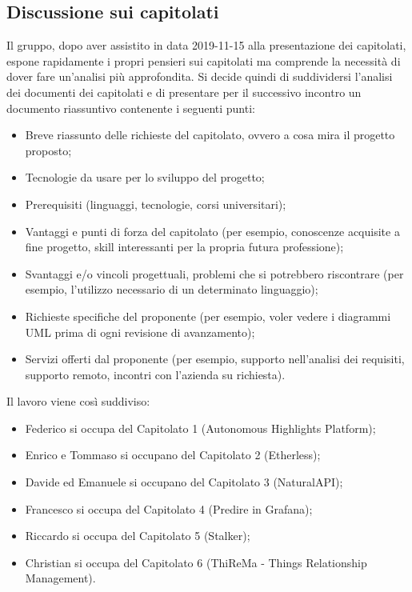 \subsection{Discussione sui capitolati}
Il gruppo, dopo aver assistito in data 2019-11-15 alla presentazione dei capitolati, espone rapidamente i propri pensieri sui capitolati ma comprende la necessità di dover fare un'analisi più approfondita.
Si decide quindi di suddividersi l'analisi dei documenti dei capitolati e di presentare per il successivo incontro un documento riassuntivo contenente i seguenti punti:
\begin{itemize}
	\item Breve riassunto delle richieste del capitolato, ovvero a cosa mira il progetto proposto;
	\item Tecnologie da usare per lo sviluppo del progetto;
	\item Prerequisiti (linguaggi, tecnologie, corsi universitari);
	\item Vantaggi e punti di forza del capitolato (per esempio, conoscenze acquisite a fine progetto, skill interessanti per la propria futura professione);
	\item Svantaggi e/o vincoli progettuali, problemi che si potrebbero riscontrare (per esempio, l'utilizzo necessario di un determinato linguaggio);
	\item Richieste specifiche del proponente (per esempio, voler vedere i diagrammi UML prima di ogni revisione di avanzamento);
	\item Servizi offerti dal proponente (per esempio, supporto nell'analisi dei requisiti, supporto remoto, incontri con l'azienda su richiesta).
\end{itemize}
Il lavoro viene così suddiviso:
\begin{itemize}
	\item Federico si occupa del Capitolato 1 (Autonomous Highlights Platform);
	\item Enrico e Tommaso si occupano del Capitolato 2 (Etherless);
	\item Davide ed Emanuele si occupano del Capitolato 3 (NaturalAPI);
	\item Francesco si occupa del Capitolato 4 (Predire in Grafana);
	\item Riccardo si occupa del Capitolato 5 (Stalker);
	\item Christian si occupa del Capitolato 6 (ThiReMa - Things Relationship Management).
\end{itemize}


\clearpage